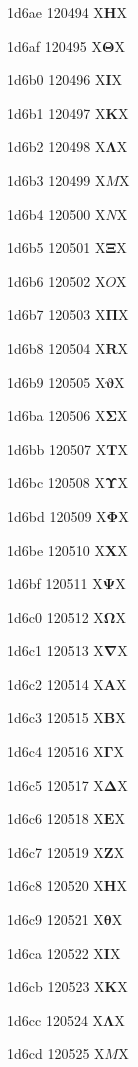 \documentclass[11pt]{article}
\begin{document}
1d6ae 120494 X{\ensuremath{\mathbf{H}}}X

1d6af 120495 X{\ensuremath{\mathbf{\Theta}}}X

1d6b0 120496 X{\ensuremath{\mathbf{I}}}X

1d6b1 120497 X{\ensuremath{\mathbf{K}}}X

1d6b2 120498 X{\ensuremath{\mathbf{\Lambda}}}X

1d6b3 120499 X{\ensuremath{M}}X

1d6b4 120500 X{\ensuremath{N}}X

1d6b5 120501 X{\ensuremath{\mathbf{\Xi}}}X

1d6b6 120502 X{\ensuremath{O}}X

1d6b7 120503 X{\ensuremath{\mathbf{\Pi}}}X

1d6b8 120504 X{\ensuremath{\mathbf{R}}}X

1d6b9 120505 X{\ensuremath{\mathbf{\vartheta}}}X

1d6ba 120506 X{\ensuremath{\mathbf{\Sigma}}}X

1d6bb 120507 X{\ensuremath{\mathbf{T}}}X

1d6bc 120508 X{\ensuremath{\mathbf{\Upsilon}}}X

1d6bd 120509 X{\ensuremath{\mathbf{\Phi}}}X

1d6be 120510 X{\ensuremath{\mathbf{X}}}X

1d6bf 120511 X{\ensuremath{\mathbf{\Psi}}}X

1d6c0 120512 X{\ensuremath{\mathbf{\Omega}}}X

1d6c1 120513 X{\ensuremath{\mathbf{\nabla}}}X

1d6c2 120514 X{\ensuremath{\mathbf{A}}}X

1d6c3 120515 X{\ensuremath{\mathbf{B}}}X

1d6c4 120516 X{\ensuremath{\mathbf{\Gamma}}}X

1d6c5 120517 X{\ensuremath{\mathbf{\Delta}}}X

1d6c6 120518 X{\ensuremath{\mathbf{E}}}X

1d6c7 120519 X{\ensuremath{\mathbf{Z}}}X

1d6c8 120520 X{\ensuremath{\mathbf{H}}}X

1d6c9 120521 X{\ensuremath{\mathbf{\theta}}}X

1d6ca 120522 X{\ensuremath{\mathbf{I}}}X

1d6cb 120523 X{\ensuremath{\mathbf{K}}}X

1d6cc 120524 X{\ensuremath{\mathbf{\Lambda}}}X

1d6cd 120525 X{\ensuremath{M}}X
\end{document}
